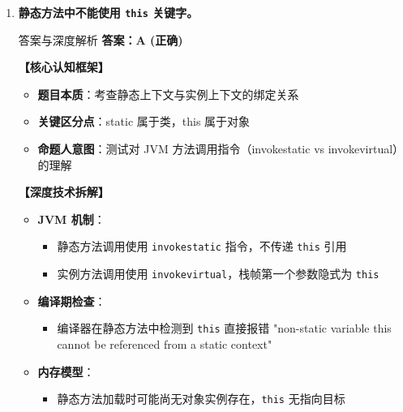 \documentclass[12pt, a4paper]{ctexart}
\newcommand{\code}[1]{\texttt{#1}}
\begin{document}
\begin{enumerate}[label=\textbf{\arabic*.}, leftmargin=*, itemsep=1.5em]
\begin{bluebox}{答案与深度解析}
		      \textbf{【应背诵知识点】}
		      \begin{itemize}[leftmargin=*, nosep]
			      \item char = 2 字节 = UTF-16 单元
			      \item 大部分汉字 = 1 个 char
			      \item 生僻字 = 2 个 char
		      \end{itemize}
	      \end{bluebox}

	\item \textbf{静态方法中不能使用 \code{this} 关键字。}
	      \begin{bluebox}{答案与深度解析}
		      \textbf{答案：A (正确)}

		      \textbf{【核心认知框架】}
		      \begin{itemize}[leftmargin=*, nosep]
			      \item \textbf{题目本质}：考查静态上下文与实例上下文的绑定关系
			      \item \textbf{关键区分点}：static 属于类，this 属于对象
			      \item \textbf{命题人意图}：测试对 JVM 方法调用指令（invokestatic vs invokevirtual）的理解
		      \end{itemize}

		      \textbf{【深度技术拆解】}
		      \begin{itemize}[leftmargin=*, nosep]
			      \item \textbf{JVM 机制}：
			            \begin{itemize}
				            \item 静态方法调用使用 \code{invokestatic} 指令，不传递 \code{this} 引用
				            \item 实例方法调用使用 \code{invokevirtual}，栈帧第一个参数隐式为 \code{this}
			            \end{itemize}
			      \item \textbf{编译期检查}：
			            \begin{itemize}
				            \item 编译器在静态方法中检测到 \code{this} 直接报错 "non-static variable this cannot be referenced from a static context"
			            \end{itemize}
			      \item \textbf{内存模型}：
			            \begin{itemize}
				            \item 静态方法加载时可能尚无对象实例存在，\code{this} 无指向目标
			            \end{itemize}
		      \end{itemize}


\end{bluebox}
\end{enumerate}
\end{document}
